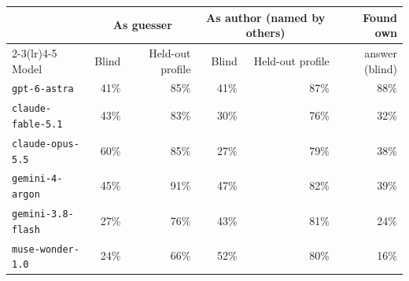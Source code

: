 \begin{tabular}{lrrrrr}
\toprule
& \multicolumn{2}{c}{As guesser} & \multicolumn{2}{c}{As author (named by others)} & Found own \\
\cmidrule(lr){2-3}\cmidrule(lr){4-5}
Model & Blind & Held-out profile & Blind & Held-out profile & answer (blind) \\
\midrule
\texttt{gpt-6-astra} & 41\% & 85\% & 41\% & 87\% & 88\% \\
\texttt{claude-fable-5.1} & 43\% & 83\% & 30\% & 76\% & 32\% \\
\texttt{claude-opus-5.5} & 60\% & 85\% & 27\% & 79\% & 38\% \\
\texttt{gemini-4-argon} & 45\% & 91\% & 47\% & 82\% & 39\% \\
\texttt{gemini-3.8-flash} & 27\% & 76\% & 43\% & 81\% & 24\% \\
\texttt{muse-wonder-1.0} & 24\% & 66\% & 52\% & 80\% & 16\% \\
\bottomrule
\end{tabular}
